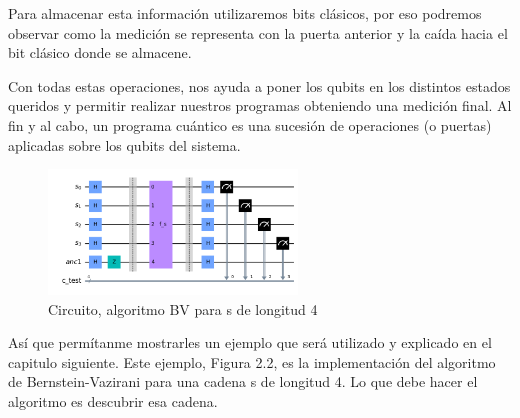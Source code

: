  Para almacenar esta información utilizaremos bits clásicos, por eso podremos observar como la medición se representa con la puerta anterior y la caída hacia el bit clásico donde se almacene. \newline
 
 Con todas estas operaciones, nos ayuda a poner los qubits en los distintos estados queridos y permitir realizar nuestros programas obteniendo una medición final. Al fin y al cabo, un programa cuántico es una sucesión de operaciones (o puertas) aplicadas sobre los qubits del sistema.

 \begin{figure}[H]
    \centering
    \includegraphics[width=0.59\textwidth]{TFG/imagenes/BV_circuito.png}
    \caption{Circuito, algoritmo BV para s de longitud 4} 
 \end{figure}

  Así que permítanme mostrarles un ejemplo que será utilizado y explicado en el capitulo siguiente. Este ejemplo, Figura 2.2, es la implementación del algoritmo de Bernstein-Vazirani para una cadena s de longitud 4. Lo que debe hacer el algoritmo es descubrir esa cadena.\newline

